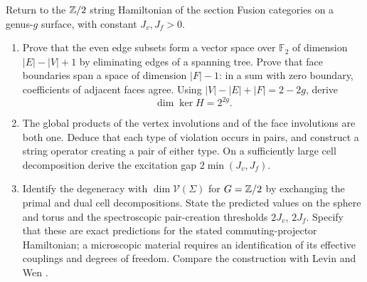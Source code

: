 \begin{exercise}
Return to the $\mathbb Z/2$ string Hamiltonian of the section Fusion
categories on a genus-$g$ surface, with constant $J_v,J_f>0$.
\begin{enumerate}[label=(\alph*)]
\item Prove that the even edge subsets form a vector space over
$\mathbb F_2$ of dimension $|E|-|V|+1$ by eliminating edges of
a spanning tree. Prove that face boundaries span a space of
dimension $|F|-1$: in a sum with zero boundary, coefficients
of adjacent faces agree. Using $|V|-|E|+|F|=2-2g$, derive
\[
 \dim\ker H=2^{2g}.
\]
\item The global products of the vertex involutions and of the
face involutions are both one. Deduce that each type of
violation occurs in pairs, and construct a string operator
creating a pair of either type. On a sufficiently large cell
decomposition derive the excitation gap $2\min(J_v,J_f)$.
\item Identify the degeneracy with $\dim\mathcal V(\Sigma)$ for
$G=\mathbb Z/2$ by exchanging the primal and dual cell decompositions.
State the predicted values on the sphere and torus and the
spectroscopic pair-creation thresholds $2J_v$, $2J_f$.
Specify that these are exact predictions for the stated
commuting-projector Hamiltonian; a microscopic material requires
an identification of its effective couplings and degrees of freedom.
Compare the construction with Levin and Wen \cite{levin-wen}.
\end{enumerate}
\end{exercise}
